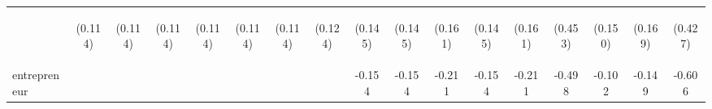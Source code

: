 \begin{center}
\begin{tabular}{lcccccccccccccccc}
\vspace{4pt} & \begin{footnotesize}(0.114)\end{footnotesize} & \begin{footnotesize}(0.114)\end{footnotesize} & \begin{footnotesize}(0.114)\end{footnotesize} & \begin{footnotesize}(0.114)\end{footnotesize} & \begin{footnotesize}(0.114)\end{footnotesize} & \begin{footnotesize}(0.114)\end{footnotesize} & \begin{footnotesize}(0.124)\end{footnotesize} & \begin{footnotesize}(0.145)\end{footnotesize} & \begin{footnotesize}(0.145)\end{footnotesize} & \begin{footnotesize}(0.161)\end{footnotesize} & \begin{footnotesize}(0.145)\end{footnotesize} & \begin{footnotesize}(0.161)\end{footnotesize} & \begin{footnotesize}(0.453)\end{footnotesize} & \begin{footnotesize}(0.150)\end{footnotesize} & \begin{footnotesize}(0.169)\end{footnotesize} & \begin{footnotesize}(0.427)\end{footnotesize} \\
entrepreneur &  &  &  &  &  &  &  & -0.154 & -0.154 & -0.211 & -0.154 & -0.211 & -0.498 & -0.102 & -0.149 & -0.606 \\

\end{tabular}
\end{center}
